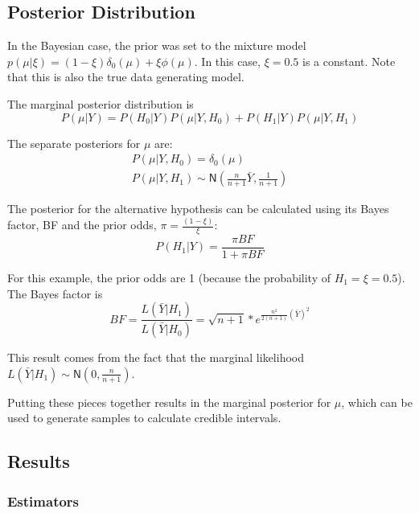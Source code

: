 \documentclass[AMA,STIX1COL]{WileyNJD-v2}\usepackage[]{graphicx}\usepackage[]{color}
\begin{document}
\subsection{Posterior Distribution}




In the Bayesian case, the prior was set to the mixture model $p(\mu|\xi) = (1-\xi ) \delta_0(\mu)+ \xi\phi(\mu)$. In this case, $\xi = 0.5$ is a constant. Note that this is also the true data generating model. 

The marginal posterior distribution is 
\begin{equation}
P(\mu | Y ) = P(H_0|Y)P(\mu|Y, H_0) + P(H_1|Y)P(\mu|Y, H_1)
\end{equation}

The separate posteriors for $\mu$ are:
\begin{gather}
P(\mu|Y, H_0) = \delta_0(\mu)\\
P(\mu|Y, H_1) \sim \textsf{N}(\frac{n}{n+1}\bar Y, \frac{1}{n+1})
\end{gather}

The posterior for the alternative hypothesis can be calculated using its Bayes factor, BF and the prior odds, $\pi = \frac{(1-\xi)}{\xi}$: 
\begin{equation}
P(H_1| Y ) = \frac{\pi BF}{1+\pi BF}
\end{equation}

For this example, the prior odds are 1 (because the probability of $H_1 = \xi = 0.5$). The Bayes factor is
\begin{equation}
BF = \frac{L(\bar Y | H_1)}{L(\bar Y | H_0)} = \sqrt{n+1}* e^{\frac{n^2}{2(n+1)}(\bar Y)^2}
\end{equation}

This result comes from the fact that the marginal likelihood $L(\bar Y | H_1) \sim \textsf{N}(0, \frac{n}{n+1})$.


Putting these pieces together results in the marginal posterior for $\mu$, which can be used to generate samples to calculate credible intervals. 



\subsection{Results}


\subsubsection{Estimators}
\end{document}
